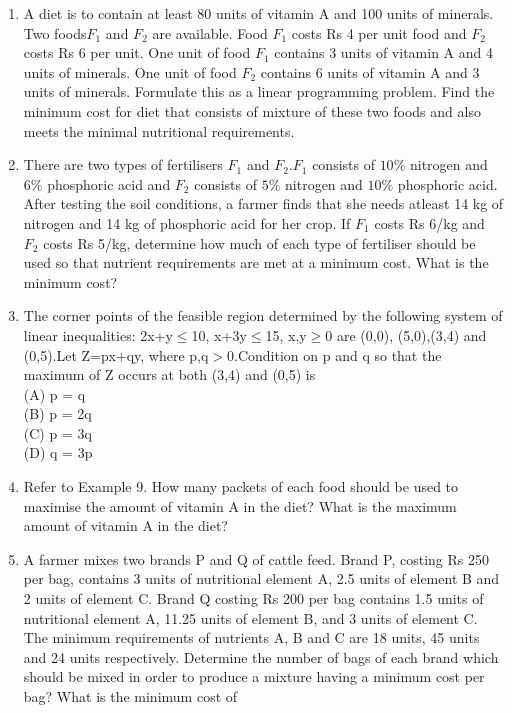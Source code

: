 \begin{enumerate}[label=\arabic*.,ref=\thesection.\theenumi]
\item A diet is to contain at least 80 units of vitamin A and 100 units of minerals. Two
foods$ F_{1}$ and $F_{2}$ are available. Food $F_{1}$ costs Rs 4 per unit food and $F_{2}$ costs
Rs 6 per unit. One unit of food $F_{1}$ contains 3 units of vitamin A and 4 units of
minerals. One unit of food $F_{2}$ contains 6 units of vitamin A and 3 units of minerals.
Formulate this as a linear programming problem. Find the minimum cost for diet
that consists of mixture of these two foods and also meets the minimal nutritional
requirements.\\
\item There are two types of fertilisers $F_{1}$ and $F_{2}$.$F_{1}$ consists of $10\%$ nitrogen and $6\%$
phosphoric acid and $F_{2}$ consists of $5\%$ nitrogen and $10\%$ phosphoric acid. After
testing the soil conditions, a farmer finds that she needs atleast 14 kg of nitrogen
and 14 kg of phosphoric acid for her crop. If $F_{1}$ costs Rs 6/kg and $F_{2}$ costs
Rs 5/kg, determine how much of each type of fertiliser should be used so that
nutrient requirements are met at a minimum cost. What is the minimum cost?\\
\item The corner points of the feasible region determined by the following system of
linear inequalities:
2x+y$\leq$10, x+3y$\leq$15, x,y$\geq$0 are (0,0), (5,0),(3,4) and (0,5).Let
Z=px+qy, where p,q$>$0.Condition on p and q so that the maximum of Z
occurs at both (3,4) and (0,5) is\\
(A) p = q\\
(B) p = 2q\\
(C) p = 3q\\
(D) q = 3p\\
\item Refer to Example 9. How many packets of each food should be used to maximise
the amount of vitamin A in the diet? What is the maximum amount of vitamin A
in the diet?\\
\item A farmer mixes two brands P and Q of cattle feed. Brand P, costing Rs 250 per
bag, contains 3 units of nutritional element A, 2.5 units of element B and 2 units
of element C. Brand Q costing Rs 200 per bag contains 1.5 units of nutritional
element A, 11.25 units of element B, and 3 units of element C. The minimum
requirements of nutrients A, B and C are 18 units, 45 units and 24 units respectively.
Determine the number of bags of each brand which should be mixed in order to
produce a mixture having a minimum cost per bag? What is the minimum cost of

\end{enumerate}

